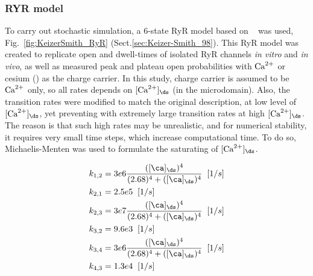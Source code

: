\subsubsection{RYR model}
\label{sec:ryr-model}

To carry out stochastic simulation, a 6-state RyR model based on
~\citep{keizer1998} was used, Fig.~\ref{fig:KeizerSmith_RyR}
(Sect.\ref{sec:Keizer-Smith_98}). This RyR model was created to replicate open
and dwell-times of isolated RyR channels {\it in vitro} and {\it in vivo}, as
well as measured peak and plateau open probabilities with ${\text{Ca}^{2+}}$ or cesium
() as the charge carrier. In this study, charge carrier is assumed to
be ${\text{Ca}^{2+}}$ only, so all rates depends on $[\Ca]_\ds$ (in the microdomain).
Also, the transition rates were modified to match the original description, at
low level of $[\Ca]_\ds$, yet preventing with extremely large transition rates
at high $[\Ca]_\ds$. The reason is that such high rates may be unrealistic, and
for numerical stability, it requires very small time steps, which increase
computational time. To do so, Michaelis-Menten was used to formulate
the saturating of $[\Ca]_\ds$.


\begin{equation}
  \label{eq:1305}
  \begin{split}
    k_{1,2} &= 3e6 \frac{([\ca]_\ds)^4}{(2.68)^4+([\ca]_\ds)^4} \;\;
    [1/s]\\
    k_{2,1} &=2.5e5 \;\;[1/s] \\
    k_{2,3} &=3e7\frac{([\ca]_\ds)^4}{(2.68)^4+([\ca]_\ds)^4} \;\;
    [1/s]\\
    k_{3,2} &= 9.6e3 \;\; [1/s] \\
    k_{3,4} &= 3e6 \frac{([\ca]_\ds)^4}{(2.68)^4+([\ca]_\ds)^4} \;\;
    [1/s]\\
    k_{4,3} &= 1.3e4 \;\; [1/s]
  \end{split}
\end{equation}


